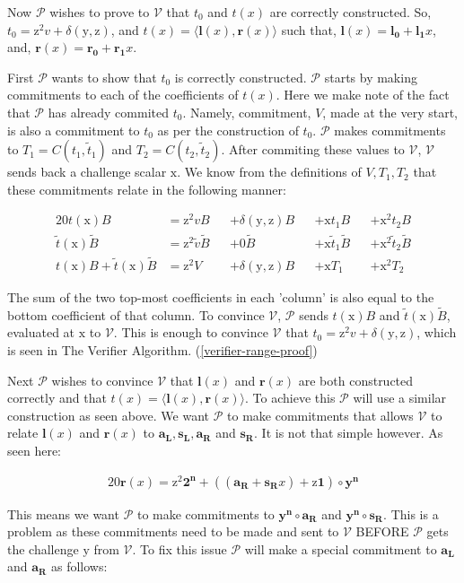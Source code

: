 \documentclass{article}
\newcommand{\eq}[1]{\begin{alignat*}{20}#1\end{alignat*}}
\renewcommand{\vec}[1]{\boldsymbol{#1}}
\newcommand{\ran}[1]{\mathrm{#1}}
\newcommand{\vecran}[1]{\mathbf{#1}}
\newcommand{\V}{\mathcal{V}}
\renewcommand{\P}{\mathcal{P}}
\newcommand{\dotp}[2]{\langle #1, #2 \rangle}
\newcommand{\opn}[1]{\operatorname{#1}}
\newcommand{\vecl}[1]{\vec{#1_{\opn{L}}}}
\newcommand{\vecr}[1]{\vec{#1_{\opn{R}}}}
\newcommand{\tB}{\widetilde{B}}
\renewcommand{\tt}{\widetilde{t}}
\newcommand{\tv}{\widetilde{v}}
\begin{document}
Now $\P$ wishes to prove to $\V$ that $t_0$ and $t(x)$ are correctly
constructed. So, $t_0 = \ran{z^2}v + \delta(\ran{y},\ran{z})$, and $t(x)
= \dotp{\vec{l}(x)}{\vec{r}(x)}$ such that, $\vec{l}(x) = \vec{l_0}
+ \vec{l_1}x$, and, $\vec{r}(x) = \vec{r_0} + \vec{r_1}x$.

First $\P$ wants to show that $t_0$ is correctly constructed. $\P$
starts by making commitments to each of the coefficients of $t(x)$. Here
we make note of the fact that $\P$ has already commited $t_0$. Namely,
commitment, $V$, made at the very start, is also a commitment to $t_0$
as per the construction of $t_0$. $\P$ makes commitments to $T_1 =
C(t_1, \tt_1)$ and $T_2 = C(t_2, \tt_2)$. After commiting these values
to $\V$, $\V$ sends back a challenge scalar $\ran{x}$. We know from
the definitions of $V, T_1, T_2$ that these commitments relate in the
following manner:

\eq{
	t(\ran{x})B                   &= \ran{z^2}vB      &&+ \delta(\ran{y},\ran{z})B &&+ \ran{x}t_1B       &&+ \ran{x^2}t_2B \\
	\tt(\ran{x})\tB               &= \ran{z^2}\tv \tB &&+ 0\tB                     &&+ \ran{x} \tt_1 \tB &&+ \ran{x^2} \tt_2 \tB\\
	t(\ran{x})B + \tt(\ran{x})\tB &= \ran{z^2}V       &&+ \delta(\ran{y},\ran{z})B &&+ \ran{x}T_1        &&+ \ran{x^2}T_2
}

The sum of the two top-most coefficients in each 'column' is also
equal to the bottom coefficient of that column. To convince $\V$, $\P$
sends $t(\ran{x})B$ and $\tt(\ran{x})\tB$, evaluated at $\ran{x}$
to $\V$. This is enough to convince $\V$ that $t_0 = \ran{z^2}v +
\delta(\ran{y},\ran{z})$, which is seen in The Verifier Algorithm.
(\ref{verifier-range-proof})

Next $\P$ wishes to convince $\V$ that $\vec{l}(x)$ and
$\vec{r}(x)$ are both constructed correctly and that $t(x) =
\dotp{\vec{l}(x)}{\vec{r}(x)}$. To achieve this $\P$ will use a similar
construction as seen above. We want $\P$ to make commitments that allows
$\V$ to relate $\vec{l}(x)$ and $\vec{r}(x)$ to $\vecl{a}, \vecl{s},
\vecr{a}$ and $\vecr{s}$. It is not that simple however. As seen here:

\eq{
	\vec{r}(x) = \ran{z^2}\vec{2^n} + ((\vecr{a} + \vecr{s}x) + \ran{z}\vec{1})\circ\vecran{y^n}
}

This means we want $\P$ to make commitments to $\vec{y^n}\circ
\vecr{a}$ and $\vec{y^n}\circ\vecr{s}$. This is a problem as these
commitments need to be made and sent to $\V$ BEFORE $\P$ gets the
challenge $\ran{y}$ from $\V$. To fix this issue $\P$ will make a
special commitment to $\vecl{a}$ and $\vecr{a}$ as follows:
\end{document}
